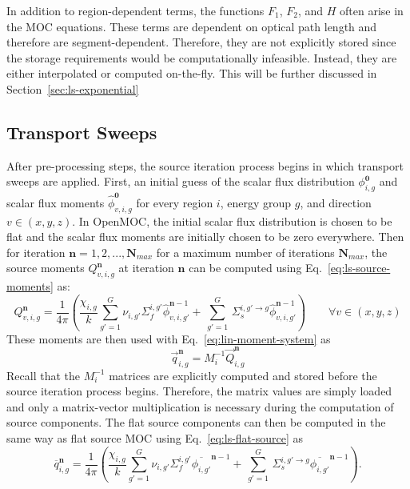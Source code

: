 In addition to region-dependent terms, the functions $F_1$, $F_2$, and $H$ often arise in the \ac{MOC} equations. These terms are dependent on optical path length and therefore are segment-dependent. Therefore, they are not explicitly stored since the storage requirements would be computationally infeasible. Instead, they are either interpolated or computed on-the-fly. This will be further discussed in Section~\ref{sec:ls-exponential}

\subsection{Transport Sweeps}

After pre-processing steps, the source iteration process begins in which transport sweeps are applied. First, an initial guess of the scalar flux distribution $\phi_{i,g}^{\mathbf{0}}$ and scalar flux moments $\hat{\phi}_{v,i,g}^{\mathbf{0}}$ for every region $i$, energy group $g$, and direction $v \in (x,y,z)$. In OpenMOC, the initial scalar flux distribution is chosen to be flat and the scalar flux moments are initially chosen to be zero everywhere. Then for iteration $\mathbf{n} = 1,2,...,\mathbf{N_{\textit{max}}}$ for a maximum number of iterations $\mathbf{N_{\textit{max}}}$, the source moments $Q_{v,i,g}^{\mathbf{n}}$ at iteration $\mathbf{n}$ can be computed using Eq.~\ref{eq:ls-source-moments} as:
\begin{equation}
Q_{v,i,g}^{\mathbf{n}} = \frac{1}{4 \pi} \left( \frac{\chi_{i,g}}{k} \sum_{g'=1}^{G} \nu_{i,g'} \Sigma_f^{i,g'} \hat{\phi}_{v,i,g'}^{\mathbf{n}-1} + \, \sum_{g'=1}^G \,  \Sigma_{s}^{i,g' \rightarrow g} \hat{\phi}_{v,i,g'}^{\mathbf{n}-1} \right) \qquad \forall v \in (x,y,z)
\end{equation}
These moments are then used with Eq.~\ref{eq:lin-moment-system} as
\begin{equation}
\vec{q}_{i,g}^{\mathbf{n}} = M_i^{-1} \vec{Q}_{i,g}^{\mathbf{n}}
\end{equation}
Recall that the $M_i^{-1}$ matrices are explicitly computed and stored before the source iteration process begins. Therefore, the matrix values are simply loaded and only a matrix-vector multiplication is necessary during the computation of source components. The flat source components can then be computed in the same way as flat source \ac{MOC} using Eq.~\ref{eq:ls-flat-source} as
\begin{equation}
\overline{q}_{i,g}^{\mathbf{n}} = \frac{1}{4 \pi} \left( \frac{\chi_{i,g}}{k} \sum_{g'=1}^{G} \nu_{i,g'} \Sigma_f^{i,g'} \overline{\phi_{i,g'}}^{\mathbf{n}-1} + \, \sum_{g'=1}^G \,  \Sigma_{s}^{i,g' \rightarrow g} \overline{\phi_{i,g'}}^{\mathbf{n}-1} \right).
\end{equation}
